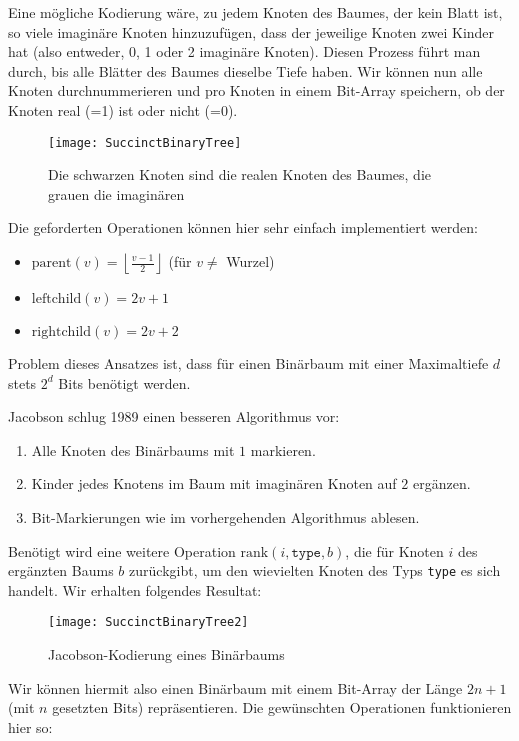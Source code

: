 Eine mögliche Kodierung wäre, zu jedem Knoten des Baumes, der kein Blatt ist, so viele imaginäre Knoten hinzuzufügen, dass der jeweilige Knoten zwei Kinder hat (also entweder, 0, 1 oder 2 imaginäre Knoten). Diesen Prozess führt man durch, bis alle Blätter des Baumes dieselbe Tiefe haben. Wir können nun alle Knoten durchnummerieren und pro Knoten in einem Bit-Array speichern, ob der Knoten real (=1) ist oder nicht (=0).

\begin{figure}[H]
  \texttt{[image: SuccinctBinaryTree]}
  \caption{Die schwarzen Knoten sind die realen Knoten des Baumes, die grauen die imaginären}
\end{figure}

Die geforderten Operationen können hier sehr einfach implementiert werden:
\begin{itemize}
  \item \( \text{parent}(v) = \left\lfloor \frac{v-1}{2} \right\rfloor \) (für \( v \neq \) Wurzel)
  \item \( \text{leftchild}(v) = 2v + 1 \)
  \item \( \text{rightchild}(v) = 2v + 2 \)
\end{itemize}

Problem dieses Ansatzes ist, dass für einen Binärbaum mit einer Maximaltiefe \( d \) stets \( 2^d \) Bits benötigt werden.

Jacobson schlug 1989 einen besseren Algorithmus vor:

\begin{enumerate}
  \item Alle Knoten des Binärbaums mit \( 1 \) markieren.
  \item Kinder jedes Knotens im Baum mit imaginären Knoten auf \( 2 \) ergänzen.
  \item Bit-Markierungen wie im vorhergehenden Algorithmus ablesen.
\end{enumerate}

Benötigt wird eine weitere Operation \( \text{rank}(i, \texttt{type}, b) \), die für Knoten \( i \) des ergänzten Baums \( b \) zurückgibt, um den wievielten Knoten des Typs \texttt{type} es sich handelt. Wir erhalten folgendes Resultat:

\begin{figure}[H]
  \texttt{[image: SuccinctBinaryTree2]}
  \caption{Jacobson-Kodierung eines Binärbaums}
\end{figure}

Wir können hiermit also einen Binärbaum mit einem Bit-Array der Länge \( 2n + 1 \) (mit \( n \) gesetzten Bits) repräsentieren. Die gewünschten Operationen funktionieren hier so:

